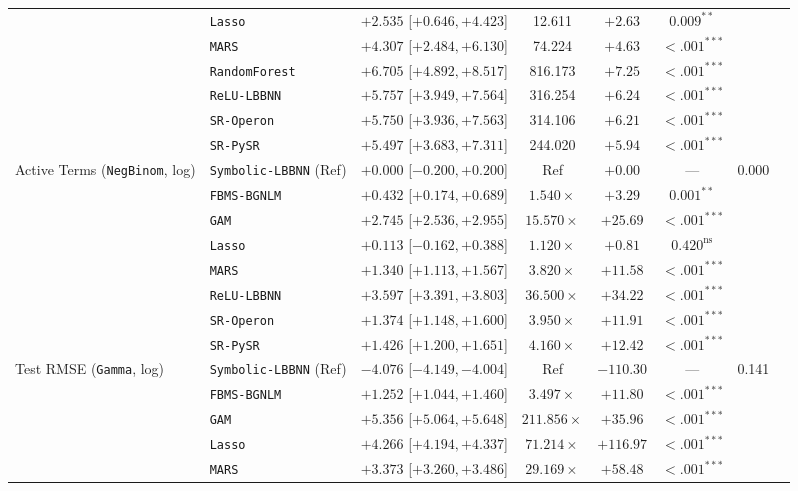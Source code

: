 \begin{table}[htbp]
{{\begin{tabular}{llcccccc}
 & \texttt{Lasso} & $+2.535$ [$+0.646, +4.423$] & 12.611 & $+2.63$ & $0.009^{**}$ &  \\
 & \texttt{MARS} & $+4.307$ [$+2.484, +6.130$] & 74.224 & $+4.63$ & $<.001^{***}$ &  \\
 & \texttt{RandomForest} & $+6.705$ [$+4.892, +8.517$] & 816.173 & $+7.25$ & $<.001^{***}$ &  \\
 & \texttt{ReLU-LBBNN} & $+5.757$ [$+3.949, +7.564$] & 316.254 & $+6.24$ & $<.001^{***}$ &  \\
 & \texttt{SR-Operon} & $+5.750$ [$+3.936, +7.563$] & 314.106 & $+6.21$ & $<.001^{***}$ &  \\
 & \texttt{SR-PySR} & $+5.497$ [$+3.683, +7.311$] & 244.020 & $+5.94$ & $<.001^{***}$ &  \\
\midrule
Active Terms (\texttt{NegBinom}, log) & \texttt{Symbolic-LBBNN} (Ref) & $+0.000$ [$-0.200, +0.200$] & Ref & $+0.00$ & --- & 0.000 \\
 & \texttt{FBMS-BGNLM} & $+0.432$ [$+0.174, +0.689$] & $1.540\times$ & $+3.29$ & $0.001^{**}$ &  \\
 & \texttt{GAM} & $+2.745$ [$+2.536, +2.955$] & $15.570\times$ & $+25.69$ & $<.001^{***}$ &  \\
 & \texttt{Lasso} & $+0.113$ [$-0.162, +0.388$] & $1.120\times$ & $+0.81$ & $0.420^{\text{ns}}$ &  \\
 & \texttt{MARS} & $+1.340$ [$+1.113, +1.567$] & $3.820\times$ & $+11.58$ & $<.001^{***}$ &  \\
 & \texttt{ReLU-LBBNN} & $+3.597$ [$+3.391, +3.803$] & $36.500\times$ & $+34.22$ & $<.001^{***}$ &  \\
 & \texttt{SR-Operon} & $+1.374$ [$+1.148, +1.600$] & $3.950\times$ & $+11.91$ & $<.001^{***}$ &  \\
 & \texttt{SR-PySR} & $+1.426$ [$+1.200, +1.651$] & $4.160\times$ & $+12.42$ & $<.001^{***}$ &  \\
\midrule
Test RMSE (\texttt{Gamma}, log) & \texttt{Symbolic-LBBNN} (Ref) & $-4.076$ [$-4.149, -4.004$] & Ref & $-110.30$ & --- & 0.141 \\
 & \texttt{FBMS-BGNLM} & $+1.252$ [$+1.044, +1.460$] & $3.497\times$ & $+11.80$ & $<.001^{***}$ &  \\
 & \texttt{GAM} & $+5.356$ [$+5.064, +5.648$] & $211.856\times$ & $+35.96$ & $<.001^{***}$ &  \\
 & \texttt{Lasso} & $+4.266$ [$+4.194, +4.337$] & $71.214\times$ & $+116.97$ & $<.001^{***}$ &  \\
 & \texttt{MARS} & $+3.373$ [$+3.260, +3.486$] & $29.169\times$ & $+58.48$ & $<.001^{***}$ &  \\

\end{tabular}}}
\end{table}
